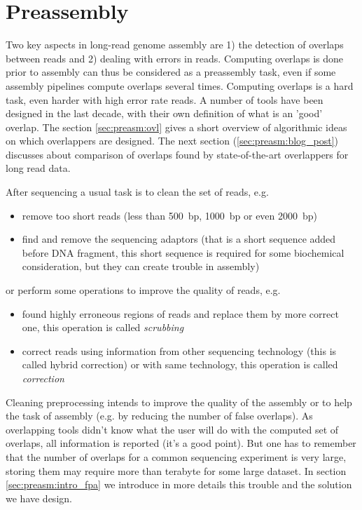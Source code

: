 \documentclass[main.tex]{subfiles}
\begin{document}
\chapter{Preassembly} \label{chapter:preassembly}

Two key aspects in long-read genome assembly are 1) the detection of overlaps between reads and 2) dealing with errors in reads. Computing overlaps is done prior to assembly can thus be considered as a preassembly task, even if some assembly pipelines compute overlaps several times. Computing overlaps is a hard task, even harder with high error rate reads. A number of tools have been designed in the last decade, with their own definition of what is an 'good' overlap. The section \ref{sec:preasm:ovl} gives a short overview of algorithmic ideas on which overlappers are designed. The next section (\ref{sec:preasm:blog_post}) discusses about comparison of overlaps found by state-of-the-art overlappers for long read data. 

\bigskip

After sequencing a usual task is to clean the set of reads, e.g.
\begin{itemize}
	\item remove too short reads (less than 500~bp, 1000~bp or even 2000~bp)
	\item find and remove the sequencing adaptors (that is a short sequence added before DNA fragment, this short sequence is required for some biochemical consideration, but they can create trouble in assembly)
\end{itemize}
or perform some operations to improve the quality of reads, e.g.
\begin{itemize}
	\item found highly erroneous regions of reads and replace them by more correct one, this operation is called \emph{scrubbing}
	\item correct reads using information from other sequencing technology (this is called hybrid correction) or with same technology, this operation is called \emph{correction} 
\end{itemize}
Cleaning preprocessing intends to improve the quality of the assembly or to help the task of assembly (e.g. by reducing the number of false overlaps). 
As overlapping tools didn't know what the user will do with the computed set of overlaps, all information is reported (it's a good point). But one has to remember that the number of overlaps for a common sequencing experiment is very large, storing them may require more than terabyte for some large dataset. In section \ref{sec:preasm:intro_fpa} we introduce in more details this trouble and the solution we have design. 
\end{document}
